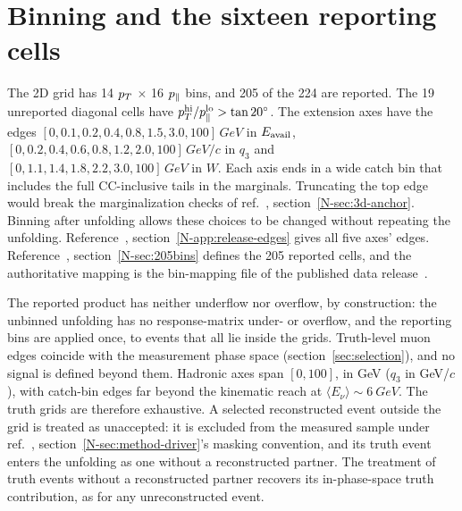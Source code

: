 
\section{Binning and the sixteen reporting cells}
\label{supp:cells}

\label{sec:method-binning}
The 2D grid has 14 $p_{T}$ $\times$ 16 $p_{\parallel}$ bins, and 205 of the 224 are reported. The 19 unreported diagonal cells have $p_{T}^{\mathrm{hi}}/p_{\parallel}^{\mathrm{lo}}>\tan20^{\circ}$. The extension axes have the edges $[0,0.1,0.2,0.4,0.8,1.5,3.0,100]\,\si{GeV}$ in $E_{\mathrm{avail}}$, $[0,0.2,0.4,0.6,0.8,1.2,2.0,100]\,\si{GeV/c}$ in $q_{3}$ and $[0,1.1,1.4,1.8,2.2,3.0,100]\,\si{GeV}$ in $W$. Each axis ends in a wide catch bin that includes the full CC-inclusive tails in the marginals. Truncating the top edge would break the marginalization checks of ref.~\cite{AnalysisNote2026}, section~\ref*{N-sec:3d-anchor}. Binning after unfolding allows these choices to be changed without repeating the unfolding. Reference~\cite{AnalysisNote2026}, section~\ref*{N-app:release-edges} gives all five axes' edges. Reference~\cite{AnalysisNote2026}, section~\ref*{N-sec:205bins} defines the 205 reported cells, and the authoritative mapping is the bin-mapping file of the published data release~\cite{MINERvA:2021owq}.

The reported product has neither underflow nor overflow, by construction: the unbinned unfolding has no response-matrix under- or overflow, and the reporting bins are applied once, to events that all lie inside the grids. Truth-level muon edges coincide with the measurement phase space (section~\ref{sec:selection}), and no signal is defined beyond them. Hadronic axes span $[0,100]$, in GeV ($q_3$ in GeV/$c$), with catch-bin edges far beyond the kinematic reach at $\langle E_\nu\rangle\sim\SI{6}{GeV}$. The truth grids are therefore exhaustive. A selected reconstructed event outside the grid is treated as unaccepted: it is excluded from the measured sample under ref.~\cite{AnalysisNote2026}, section~\ref*{N-sec:method-driver}'s masking convention, and its truth event enters the unfolding as one without a reconstructed partner. The treatment of truth events without a reconstructed partner recovers its in-phase-space truth contribution, as for any unreconstructed event.

